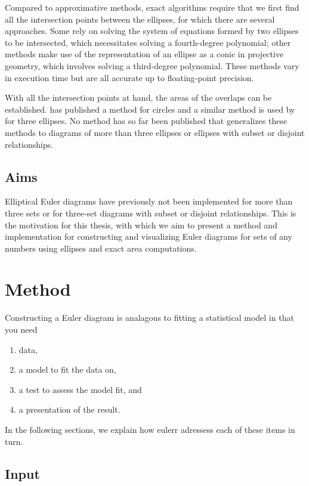\documentclass[
  oneside,
  openany,
  numbers=noendperiod,
  parskip=half,
  bibliography=totoc
]{scrbook}\usepackage[]{graphicx}\usepackage{xcolor}
\newcommand{\pkg}[1]{{\fontseries{b}\selectfont #1}}
\begin{document}
Compared to approximative methods, exact algorithms require that we
first find all the intersection points between the ellipses, for which there are
several approaches. Some rely on solving the system of equations formed by two
ellipses to be intersected, which necessitates solving a fourth-degree
polynomial; other methods make use of the representation of an ellipse as a
conic in projective geometry, which involves solving a third-degree polynomial.
These methods vary in execution time but are all accurate up to
floating-point precision.

With all the intersection points at hand, the areas of the overlaps can be
established. \citet{frederickson_2013} has published a method for circles
and a similar method is used by \citet{micallef_2014a} for three ellipses. No
method has so far been published that
generalizes these methods to diagrams of more than three ellipses or ellipses
with subset or disjoint relationships.

\section{Aims}
\label{sec:aims}

Elliptical Euler diagrams have previously not been implemented for more than
three sets or for three-set diagrams with subset or disjoint relationships. This
is the motivation for this thesis, with which we aim to present
a method and implementation for constructing and visualizing Euler diagrams for
sets of any numbers using ellipses and exact area computations.

\chapter{Method}
\label{ch:method}

Constructing a Euler diagram is analagous to fitting a statistical model in that
you need
\begin{enumerate}
\item data,
\item a model to fit the data on,
\item a test to assess the model fit, and
\item a presentation of the result.
\end{enumerate}
In the following sections, we explain how \pkg{eulerr} adressess each of these
items in turn.

\section{Input}
\label{sec:input}
\end{document}
